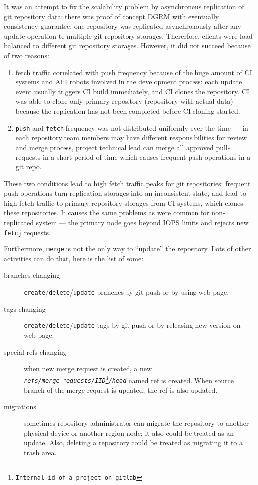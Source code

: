 \documentclass[acmlarge, screen, nonacm, 11pt]{acmart}
\newcommand{\code}[1]{\texttt{#1}}
\begin{document}
It was an attempt to fix the scalability problem by asynchronous replication of git repository data:
there was proof of concept DGRM with eventually consistency guarantee;
one repository was replicated asynchronously after any update operation to multiple git repository storages. Thererfore,
clients were load balanced to different git repository storages.
However, it did not succeed because of two reasons:
\begin{enumerate}
  \item fetch traffic correlated with push frequency because of the huge amount of
  CI systems and API robots involved in the development process: each update event usually triggers
  CI build immediately, and CI clones the repository. CI was able to clone only
  primary repository (repository with actual data) because the replication has not been completed
  before CI cloning started.
  \item \code{push} and \code{fetch} frequency was not distributed uniformly over the time --- in each
  repository team members may have different responsibilities for review and merge process,
  project technical lead can merge all approved pull-requests in a short period of time
  which causes frequent push operations in a git repo.
\end{enumerate}

These two conditions lead to high fetch traffic peaks for git repositories:
frequent push operations turn replication storages into an inconsistent state,
and lead to high fetch traffic to primary repository storages from CI systems, which clones these repositories.
It causes the same problems as were common for non-replicated system --- the primary node goes beyond IOPS limits and
rejects new \code{fetcj} requests.

Furthermore, \code{merge} is not the only way to ``update'' the repository. Lots of other activities can do that,
here is the list of some:

\begin{description}
  \item[branches changing] \verb|create|/\verb|delete|/\verb|update| branches by git push or by using web page.
  \item[tags changing] \verb|create|/\verb|delete|/\verb|update| tags by git push or by releasing new version on web page.
  \item[special refs changing] when new merge request is created, a new\\
    \emph{\code{refs/merge-requests/IID\footnote{Internal id of a project on gitlab}/head}} named ref
    is created. When source branch of the merge request is updated, the ref is also updated.
  \item[migrations] sometimes repository administrator can migrate the repository to
    another physical device or another region node; it also could be treated as an update.
    Also, deleting a repository could be treated as migrating it to a trash area.
\end{description}
\end{document}
